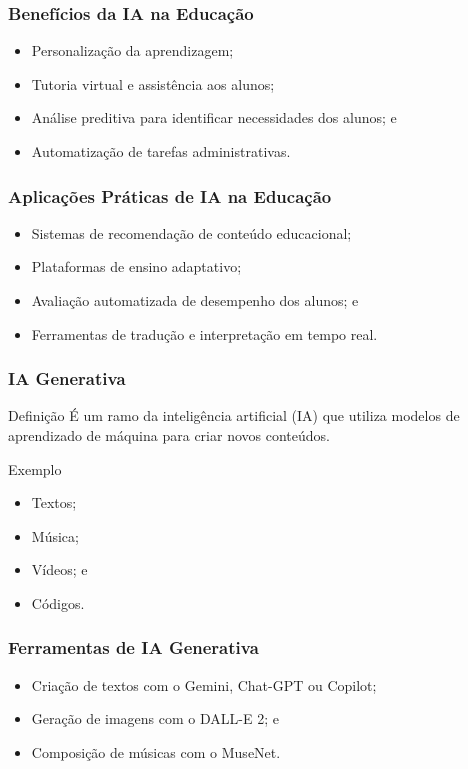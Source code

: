 \documentclass[aspectratio=169]{beamer} %
\begin{document}
\begin{frame}
	\frametitle{Benefícios da IA na Educação}
	
	\begin{itemize}
		\item Personalização da aprendizagem;
		\item Tutoria virtual e assistência aos alunos;
		\item Análise preditiva para identificar necessidades dos alunos; e
		\item Automatização de tarefas administrativas.
	\end{itemize}
\end{frame}

\begin{frame}
	\frametitle{Aplicações Práticas de IA na Educação}
	
	\begin{itemize}
		\item Sistemas de recomendação de conteúdo educacional;
		\item Plataformas de ensino adaptativo;
		\item Avaliação automatizada de desempenho dos alunos; e
		\item Ferramentas de tradução e interpretação em tempo real.
	\end{itemize}
\end{frame}

\begin{frame}
	\frametitle{IA Generativa}
	
	\begin{block}{Definição}
		 É um ramo da inteligência artificial (IA) que utiliza modelos de aprendizado de máquina para criar novos conteúdos.
	\end{block}\vfill
	
	\begin{exampleblock}{Exemplo}
		\begin{itemize}
			\item Textos;
			\item Música;
			\item Vídeos; e
			\item Códigos.
		\end{itemize}
	\end{exampleblock}
\end{frame}

\begin{frame}
	\frametitle{Ferramentas de IA Generativa}
	
	\begin{itemize}
		\item Criação de textos com o Gemini, Chat-GPT ou Copilot;
		\item Geração de imagens com o DALL-E 2; e
		\item Composição de músicas com o MuseNet.
	\end{itemize}
\end{frame}
\end{document}
